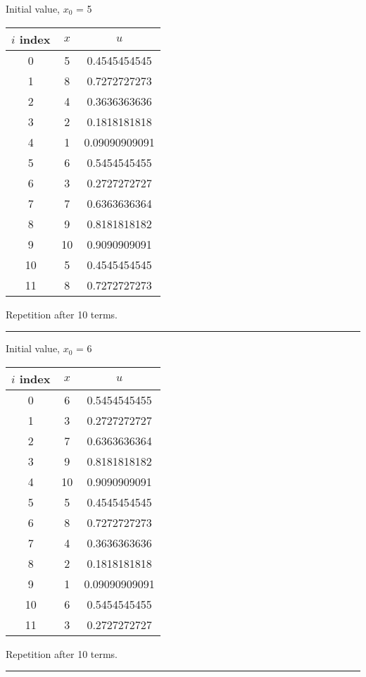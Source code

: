 \documentclass{article}
\begin{document}
Initial value, $x_0$ = 5
\begin{center} \begin{tabular}{||c | c | c||}  \hline
		$i$ index & $x$ & $u$ \\ [0.5ex] \hline \hline0 & 5 & 0.4545454545\\
		\hline 
		1 & 8 & 0.7272727273\\
		\hline 
		2 & 4 & 0.3636363636\\
		\hline 
		3 & 2 & 0.1818181818\\
		\hline 
		4 & 1 & 0.09090909091\\
		\hline 
		5 & 6 & 0.5454545455\\
		\hline 
		6 & 3 & 0.2727272727\\
		\hline 
		7 & 7 & 0.6363636364\\
		\hline 
		8 & 9 & 0.8181818182\\
		\hline 
		9 & 10 & 0.9090909091\\
		\hline 
		10 & 5 & 0.4545454545\\
		\hline 
		11 & 8 & 0.7272727273\\
		\hline 
	\end{tabular} 
\end{center} Repetition after 10 terms.
\\ \noindent\rule[0.5ex]{\linewidth}{1pt}
Initial value, $x_0$ = 6
\begin{center} \begin{tabular}{||c | c | c||}  \hline
		$i$ index & $x$ & $u$ \\ [0.5ex] \hline \hline0 & 6 & 0.5454545455\\
		\hline 
		1 & 3 & 0.2727272727\\
		\hline 
		2 & 7 & 0.6363636364\\
		\hline 
		3 & 9 & 0.8181818182\\
		\hline 
		4 & 10 & 0.9090909091\\
		\hline 
		5 & 5 & 0.4545454545\\
		\hline 
		6 & 8 & 0.7272727273\\
		\hline 
		7 & 4 & 0.3636363636\\
		\hline 
		8 & 2 & 0.1818181818\\
		\hline 
		9 & 1 & 0.09090909091\\
		\hline 
		10 & 6 & 0.5454545455\\
		\hline 
		11 & 3 & 0.2727272727\\
		\hline 
	\end{tabular} 
\end{center} Repetition after 10 terms.
\\ \noindent\rule[0.5ex]{\linewidth}{1pt}
\pagebreak
\end{document}
